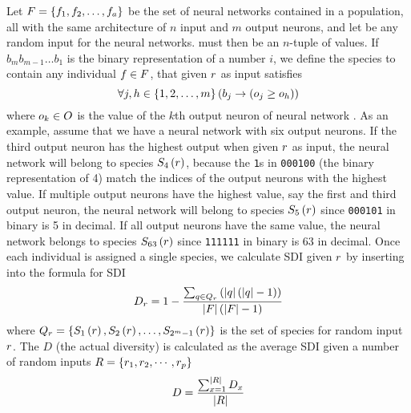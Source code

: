 Let $F = \left\{ f_1, f_2, \dots, f_a \right\}$ be the set of neural networks contained in a population, all with the same architecture of $n$ input and $m$ output neurons, and let \ran{} be any random input for the neural networks. \ran{} must then be an $n$-tuple of values. If $b_{m}b_{m-1}\dots b_1$ is the binary representation of a number $i$, we define the species  to contain any individual $f \in F$, that given $r$ as input satisfies
%
\begin{equation}\label{eq:nntdbucket}
  \forall j, h \in \left\{ 1, 2, \dots, m \right\} \left(b_j \rightarrow \left(o_j \geq o_h\right)\right)
\end{equation}
%
where $o_k \in O$ is the value of the $k$th output neuron of neural network \ind. As an example, assume that we have a neural network with six output neurons. If the third output neuron has the highest output when given $r$ as input, the neural network will belong to species $S_{4}\left(r\right)$, because the \texttt{1}s in \texttt{000100} (the binary representation of 4) match the indices of the output neurons with the highest value. If multiple output neurons have the highest value, say the first and third output neuron, the neural network will belong to species $S_{5}\left(r\right)$ since \texttt{000101} in binary is 5 in decimal. If all output neurons have the same value, the neural network belongs to species $S_{63}\left(r\right)$ since \texttt{111111} in binary is 63 in decimal.
Once each individual is assigned a single species, we calculate SDI given $r$ by inserting into the formula for SDI\cite{Venturi2007182}
%
\begin{equation*}\label{eq:nntd}
  D_r = 1 - \frac{\sum_{q \in Q_{r}}\left(\lvert q\rvert\left(\lvert q\rvert - 1\right)\right)}{\lvert F\rvert\left(\lvert F\rvert - 1\right)}
\end{equation*}
%
where $Q_r = \left\{ S_{1}\left(r\right), S_{2}\left(r\right), \dots, S_{2^{m}-1}\left(r\right) \right\}$ is the set of species for random input $r$. The \dia{} $D$ (the actual diversity) is calculated as the average SDI given a number of random inputs $R = \left\{ r_1, r_2, \cdots, r_p \right\}$
%
\begin{equation}\label{eq:nntdavg}
  D =\frac{\sum_{x=1}^{\lvert R\rvert}{D_x}}{\lvert R\rvert}
\end{equation}
%

